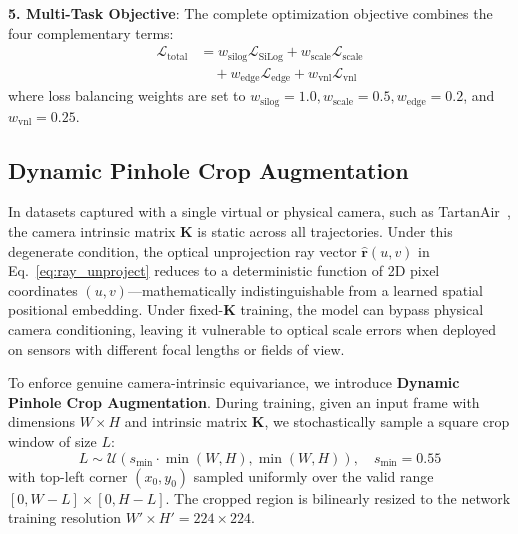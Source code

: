 \noindent\textbf{5. Multi-Task Objective}:
The complete optimization objective combines the four complementary terms:
\begin{equation}
\begin{split}
    \mathcal{L}_{\text{total}} &= w_{\text{silog}} \mathcal{L}_{\text{SiLog}} + w_{\text{scale}} \mathcal{L}_{\text{scale}} \\
    &\quad + w_{\text{edge}} \mathcal{L}_{\text{edge}} + w_{\text{vnl}} \mathcal{L}_{\text{vnl}}
\end{split}
\end{equation}
where loss balancing weights are set to $w_{\text{silog}} = 1.0, w_{\text{scale}} = 0.5, w_{\text{edge}} = 0.2$, and $w_{\text{vnl}} = 0.25$.

\subsection{Dynamic Pinhole Crop Augmentation}
\label{sec:dynamic_crop}
In datasets captured with a single virtual or physical camera, such as TartanAir~\cite{wang2020tartanair}, the camera intrinsic matrix $\mathbf{K}$ is static across all trajectories. Under this degenerate condition, the optical unprojection ray vector $\hat{\mathbf{r}}(u, v)$ in Eq.~\eqref{eq:ray_unproject} reduces to a deterministic function of 2D pixel coordinates $(u, v)$---mathematically indistinguishable from a learned spatial positional embedding. Under fixed-$\mathbf{K}$ training, the model can bypass physical camera conditioning, leaving it vulnerable to optical scale errors when deployed on sensors with different focal lengths or fields of view.

To enforce genuine camera-intrinsic equivariance, we introduce \textbf{Dynamic Pinhole Crop Augmentation}. During training, given an input frame with dimensions $W \times H$ and intrinsic matrix $\mathbf{K}$, we stochastically sample a square crop window of size $L$:
\begin{equation}
    L \sim \mathcal{U}(s_{\min} \cdot \min(W, H), \min(W, H)), \quad s_{\min} = 0.55
\end{equation}
with top-left corner $(x_0, y_0)$ sampled uniformly over the valid range $[0, W - L] \times [0, H - L]$. The cropped region is bilinearly resized to the network training resolution $W' \times H' = 224 \times 224$. 

